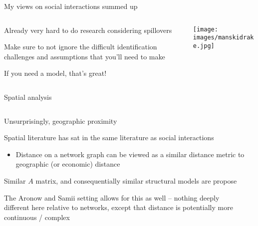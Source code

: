 \documentclass[notes,11pt, aspectratio=169]{beamer}
\newenvironment{wideitemize}{\itemize\addtolength{\itemsep}{10pt}}{\enditemize}
\begin{document}
\begin{frame}{My views on social interactions summed up}
\begin{columns}[T] %
  \begin{column}{.5\textwidth}
    \begin{wideitemize}
    \item Already very hard to do research considering spillovers
    \item Make sure to not ignore the difficult identification
      challenges and assumptions that you'll need to make
    \item If you need a model, that's great!
    \end{wideitemize}
  \end{column}%
  \hfill%
  \begin{column}{.5\textwidth}
    \texttt{[image: images/manskidrake.jpg]}
  \end{column}
\end{columns}
    
\end{frame}


\begin{frame}{Spatial analysis}
\begin{columns}[T] %
  \begin{column}{.7\textwidth}
    \begin{wideitemize}
    \item Unsurprisingly, geographic proximity
    \item Spatial literature has sat in the same literature as social interactions
      \begin{itemize}
      \item Distance on a network graph can be viewed as a similar
        distance metric to geographic (or economic) distance
      \end{itemize}
    \item Similar $A$ matrix, and consequentially similar structural models are propose
    \item The Aronow and Samii setting allows for this as well --
      nothing deeply different here relative to networks, except that
      distance is potentially more continuous / complex
    \end{wideitemize}
  \end{column}%
  \hfill%
  \begin{column}{.5\textwidth}
    \begin{center}
    \end{center}
  \end{column}
\end{columns}

\end{frame}
\end{document}
